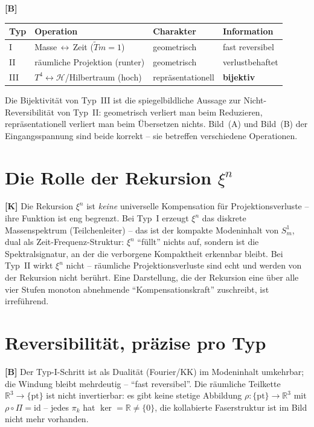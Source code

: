 \textbf{[B]}
\begin{center}
\renewcommand{\arraystretch}{1.35}
{\small
\begin{tabular}{llll}
\toprule
\textbf{Typ} & \textbf{Operation} & \textbf{Charakter} & \textbf{Information} \\
\midrule
I & Masse\,$\leftrightarrow$\,Zeit ($\tilde Tm=1$) & geometrisch & fast reversibel \\
II & räumliche Projektion (runter) & geometrisch & verlustbehaftet \\
III & $T^4\leftrightarrow\mathcal H$/Hilbertraum (hoch) & repräsentationell & \textbf{bijektiv} \\
\bottomrule
\end{tabular}
}
\renewcommand{\arraystretch}{1.0}
\end{center}

Die Bijektivität von Typ~III ist die spiegelbildliche Aussage zur
Nicht-Reversibilität von Typ~II: geometrisch verliert man beim Reduzieren,
repräsentationell verliert man beim Übersetzen nichts. Bild~(A) und Bild~(B) der
Eingangsspannung sind beide korrekt -- sie betreffen verschiedene Operationen.

\section{Die Rolle der Rekursion $\xi^n$}

\textbf{[K]} Die Rekursion $\xi^n$ ist \emph{keine} universelle Kompensation für
Projektionsverluste -- ihre Funktion ist eng begrenzt. Bei Typ~I erzeugt $\xi^n$
das diskrete Massenspektrum (Teilchenleiter) -- das ist der kompakte Modeninhalt
von $S^1_m$, dual als Zeit-Frequenz-Struktur: $\xi^n$ \enquote{füllt} nichts auf,
sondern ist die Spektralsignatur, an der die verborgene Kompaktheit erkennbar
bleibt. Bei Typ~II wirkt $\xi^n$ nicht -- räumliche Projektionsverluste sind echt
und werden von der Rekursion nicht berührt. Eine Darstellung, die der Rekursion
eine über alle vier Stufen monoton abnehmende \enquote{Kompensationskraft}
zuschreibt, ist irreführend.

\section{Reversibilität, präzise pro Typ}

\textbf{[B]} Der Typ-I-Schritt ist als Dualität (Fourier/KK) im Modeninhalt
umkehrbar; die Windung bleibt mehrdeutig -- \enquote{fast reversibel}. Die
räumliche Teilkette $\mathbb{R}^3\to\{\mathrm{pt}\}$ ist nicht invertierbar: es
gibt keine stetige Abbildung $\rho:\{\mathrm{pt}\}\to\mathbb{R}^3$ mit
$\rho\circ\Pi=\mathrm{id}$ -- jedes $\pi_k$ hat $\ker=\mathbb{R}\neq\{0\}$, die
kollabierte Faserstruktur ist im Bild nicht mehr vorhanden.

